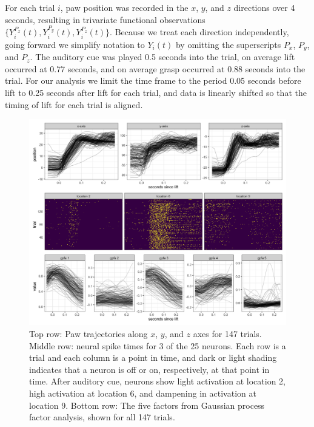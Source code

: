 \documentclass[preprint]{JASA}
\begin{document}
For each trial \(i\), paw position was recorded in the \(x\), \(y\), and
\(z\) directions over 4 seconds, resulting in trivariate functional
observations \(\{ Y_i^{P_x}(t), Y_i^{P_y}(t), Y_i^{P_z}(t)\}\). Because
we treat each direction independently, going forward we simplify
notation to \(Y_i(t)\) by omitting the superscripts \(P_x\), \(P_y\),
and \(P_z\). The auditory cue was played 0.5 seconds into the trial, on
average lift occurred at 0.77 seconds, and on average grasp occurred at
0.88 seconds into the trial. For our analysis we limit the time frame to
the period 0.05 seconds before lift to 0.25 seconds after lift for each
trial, and data is linearly shifted so that the timing of lift for each
trial is aligned.

\begin{figure}
\includegraphics[width=\reprintcolumnwidth]{../output/fig_data_eda-1} \caption{Top row: Paw trajectories along $x$, $y$, and $z$ axes for 147 trials. Middle row: neural spike times for 3 of the 25 neurons. Each row is a trial and each column is a point in time, and dark or light shading indicates that a neuron is off or on, respectively, at that point in time. After auditory cue, neurons show light activation at location 2, high activation at location 6, and dampening in activation at location 9. Bottom row: The five factors from Gaussian process factor analysis, shown for all 147 trials.}\label{fig:flode_data}
\end{figure}
\end{document}
